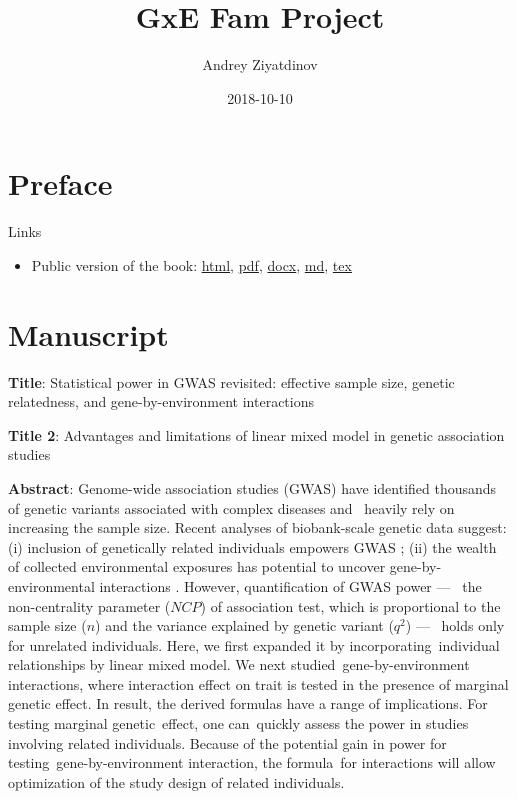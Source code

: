 \documentclass[]{book}
\title{GxE Fam Project}
\author{Andrey Ziyatdinov}
\date{2018-10-10}
\providecommand{\tightlist}{%
  \setlength{\itemsep}{0pt}\setlength{\parskip}{0pt}}
\begin{document}
\maketitle

\setlength{\abovedisplayskip}{-5pt}
\setlength{\abovedisplayshortskip}{-5pt}

{
\hypersetup{linkcolor=black}
\setcounter{tocdepth}{2}
\tableofcontents
}
\chapter*{Preface}\label{preface}

Links

\begin{itemize}
\tightlist
\item
  Public version of the book:
  \href{https://hemostat.github.io/Public/Papers/05-int-rel/bookdown/index.html}{html},
  \href{https://hemostat.github.io/Public/Papers/05-int-rel/bookdown/gxefam.pdf}{pdf},
  \href{https://hemostat.github.io/Public/Papers/05-int-rel/bookdown/gxefam.docx}{docx},
  \href{https://raw.githubusercontent.com/hemostat/Public/gh-pages/Papers/05-int-rel/bookdown/gxefam.md}{md},
  \href{https://hemostat.github.io/Public/Papers/05-int-rel/bookdown/gxefam.tex}{tex}
\end{itemize}

\chapter{Manuscript}\label{manuscript}

\textbf{Title}: Statistical power in GWAS revisited: effective sample
size, genetic relatedness, and gene-by-environment interactions

\textbf{Title 2}: Advantages and limitations of linear mixed model in
genetic association studies

\textbf{Abstract}: Genome-wide association studies (GWAS) have
identified thousands of genetic variants associated with complex
diseases and~ heavily rely on increasing the sample size. Recent
analyses of biobank-scale genetic data suggest: (i) inclusion of
genetically related individuals empowers GWAS \citep{loh2018mixed}; (ii)
the wealth of collected environmental exposures has potential to uncover
gene-by-environmental interactions \citep{young2016multiple}. However,
quantification of GWAS power ---~ the non-centrality parameter (\(NCP\))
of association test, which is proportional to the sample size (\(n\))
and the variance explained by genetic variant (\(q^2\)) ---~ holds only
for unrelated individuals. Here, we first expanded it by
incorporating~individual relationships by linear mixed model. We next
studied~gene-by-environment interactions, where interaction effect on
trait is tested in the presence of marginal genetic effect. In result,
the derived formulas have a range of implications. For testing marginal
genetic~effect, one can~quickly assess the power in studies involving
related individuals. Because of the potential gain in power for
testing~gene-by-environment interaction, the formula~for interactions
will allow optimization of the study design of related individuals.
\end{document}
